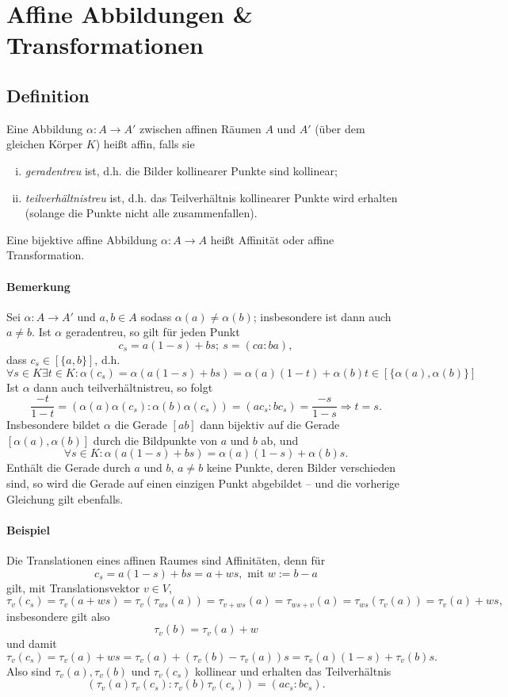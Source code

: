 \section{Affine Abbildungen \& Transformationen}
\subsection{Definition}
	\begin{Definition}
		Eine Abbildung $ \alpha:A\to A' $ zwischen affinen Räumen $ A $ und $ A' $ (über dem gleichen Körper $ K $) heißt affin, falls sie
			\begin{enumerate}[(i)]
				\item \emph{geradentreu} ist, d.h. die Bilder kollinearer Punkte sind kollinear;
				\item \emph{teilverhältnistreu} ist, d.h. das Teilverhältnis kollinearer Punkte wird erhalten (solange die Punkte nicht alle zusammenfallen).
			\end{enumerate}
		Eine bijektive affine Abbildung $ \alpha:A\to A $ heißt Affinität oder affine Transformation.
	\end{Definition}
	
\paragraph{Bemerkung}
	Sei $ \alpha:A\to A' $ und $ a,b\in A $ sodass $ \alpha(a)\neq \alpha(b) $; insbesondere ist dann auch $ a\neq b $. Ist $ \alpha $ geradentreu, so gilt für jeden Punkt
		\[ c_s = a(1-s)+bs;\ s=(ca:ba), \]
	dass $ c_s\in [\{a,b\}] $, d.h.
		\[ \forall s\in K\exists t\in K:\alpha(c_s) = \alpha(a(1-s)+bs) = \alpha(a)(1-t)+\alpha(b)t \in [\{\alpha(a),\alpha(b)\}] \]
	Ist $ \alpha $ dann auch teilverhältnistreu, so folgt
		\[ \frac{-t}{1-t} = (\alpha(a)\alpha(c_s):\alpha(b)\alpha(c_s)) = (ac_s:bc_s) = \frac{-s}{1-s} \Rightarrow t = s. \]
	Insbesondere bildet $ \alpha $ die Gerade $ [ab] $ dann bijektiv auf die Gerade $ [\alpha(a),\alpha(b)] $ durch die Bildpunkte von $ a $ und $ b $ ab, und 
		\[ \forall s\in K:\alpha(a(1-s)+bs)=\alpha(a)(1-s)+\alpha(b)s. \]
	Enthält die Gerade durch $ a $ und $ b $, $ a\neq b $ keine Punkte, deren Bilder verschieden sind, so wird die Gerade auf einen einzigen Punkt abgebildet -- und die vorherige Gleichung gilt ebenfalls.
	
\paragraph{Beispiel}
	Die Translationen eines affinen Raumes sind Affinitäten, denn für
		\[ c_s = a(1-s)+bs = a + ws, \text{ mit } w:=b-a \]
	gilt, mit Translationsvektor $ v\in V $,
		\[ \tau_v(c_s) = \tau_v(a+ws) = \tau_v(\tau_{ws}(a)) = \tau_{v+ws}(a) = \tau_{ws+v}(a) = \tau_{ws}(\tau_v(a)) =  \tau_v(a) + ws, \]
	insbesondere gilt also
		\[ \tau_v(b) = \tau_v(a)+w \]
	und damit
		\[ \tau_v(c_s) = \tau_v(a)+ws = \tau_v(a)+(\tau_v(b)-\tau_v(a))s = \tau_v(a)(1-s)+\tau_v(b)s.\]
	Also sind $ \tau_v(a),\tau_v(b) $ und $ \tau_v(c_s) $ kollinear und erhalten das Teilverhältnis
		\[ (\tau_v(a)\tau_v(c_s):\tau_v(b)\tau_v(c_s)) = (ac_s:bc_s). \]
		
